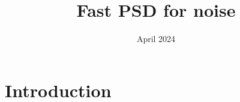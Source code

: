 \documentclass{article}
\title{Fast PSD for  noise}
\author{}
\date{April 2024}
\begin{document}
\maketitle

\section{Introduction}
\end{document}
